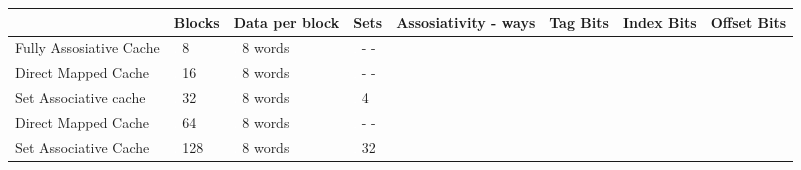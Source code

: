 \documentclass[addpoints]{exam}
\begin{document}
\begin{sloppypar}
\begin{questions}
    \begin{tabular}{|p{20mm} | p{10mm} | p{15mm} |p{10mm} |p{20mm} |p{15mm} |p{10mm} |p{10mm} |}
        \hline
        & Blocks & Data per block & Sets & Assosiativity - ways & Tag Bits & Index Bits & Offset Bits \\ \hline
        \raggedright Fully \newline Assosiative Cache &\textcolor{white}{.} \newline \hspace*{3mm} 8 &\textcolor{white}{.} \newline \hspace*{1mm} 8 words &\textcolor{white}{.} \newline \hspace*{2mm} - - & & & & \\ \hline
        \raggedright Direct Mapped Cache & \textcolor{white}{.} \newline \hspace*{2mm} 16 & \textcolor{white}{.} \newline \hspace*{1mm} 8 words & \textcolor{white}{.} \newline \hspace*{2mm} - - & & & & \\ \hline
        \raggedright Set \newline Associative cache & \textcolor{white}{.} \newline \hspace*{2mm} 32 & \textcolor{white}{.} \newline \hspace*{1mm} 8 words & \textcolor{white}{.} \newline \hspace*{3mm} 4 & & & & \\ \hline
        \raggedright Direct Mapped Cache & \textcolor{white}{.} \newline \hspace*{2mm} 64 & \textcolor{white}{.} \newline \hspace*{1mm} 8 words & \textcolor{white}{.} \newline \hspace*{2mm} - - & & & & \\ \hline
        \raggedright Set \newline Associative Cache & \textcolor{white}{.} \newline \hspace*{1mm} 128 & \textcolor{white}{.} \newline \hspace*{1mm} 8 words & \textcolor{white}{.} \newline \hspace*{2mm} 32 & & & & \\ \hline

\end{tabular}
\end{questions}
\end{sloppypar}
\end{document}
